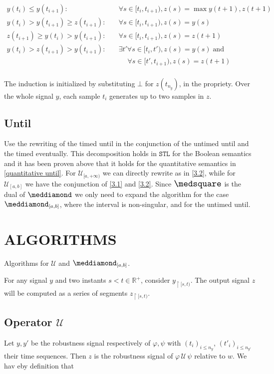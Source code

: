 \documentclass{suftesi}
\newcommand{\STL}{$\mathtt{STL}$ }
\begin{document}
\begin{align*}
    y(t_i)\leq y(t_{i+1}) :                 & \quad \forall s\in[t_i,t_{i+1}), z(s)=\max{y(t+1),z(t+1)}  \\
    y(t_i) > y(t_{i+1}) \geq z(t_{i+1}) :   & \quad \forall s\in[t_i,t_{i+1}), z(s)=y(s)\\
    z(t_{i+1}) \geq y(t_i) > y(t_{i+1}) :   & \quad \forall s\in[t_i,t_{i+1}), z(s)=z(t+1)\\
    y(t_i) > z(t_{i+1}) > y(t_{i+1}) :      & \quad \exists t' \forall s \in [t_i,t'), z(s)=y(s)\;\text{and} \\ 
                                            & \quad \quad \;\forall s\in[t',t_{i+1}), z(s)=z(t+1)\\
\end{align*}

The induction is initialized by substituting $\bot$ for $z(t_{n_y})$, in the propriety. Over the whole signal $y$, each sample $t_i$ generates up to two samples in $z$.

\subsection{Until}

Use the rewriting of the timed until in the conjunction of the untimed until and the timed eventually. This decomposition holds in \STL for the Boolean semantics and it has been proven above that it holds for the quantitative semantics in \ref{quantitative until}. For $\mathcal{U}_{[a,+\infty)}$ we can directly rewrite as in \ref{3.2}, while for $\mathcal{U}_{[a,b]}$ we have the conjunction of \ref{3.1} and \ref{3.2}. Since $\nec$ is the dual of $\pos$ we only need to expand the algorithm for the case $\pos_{[a,b]}$, where the interval is non-singular, and for the untimed until.%

\section{ALGORITHMS}

Algorithms for $\mathcal{U}$ and $\pos_{[a,b]}$. 

For any signal $y$ and two instants $s<t \in \mathbb{R}^+$, consider $y_{\upharpoonright[s,t)}$. The output signal $z$ will be computed as a series of segments $z_{\upharpoonright[s,t)}$.

\subsection{Operator $\mathcal{U}$}
Let $y,y'$ be the robustness signal respectively  of $\varphi,\psi$ with $(t_i)_{i\leq n_y}$, $(t'_i)_{i\leq n_{y'}}$  their time sequences. Then $z$ is the robustness signal of $\varphi\,\mathcal{U}\,\psi$ relative to $w$. We hav eby definition that $$$$
\end{document}
